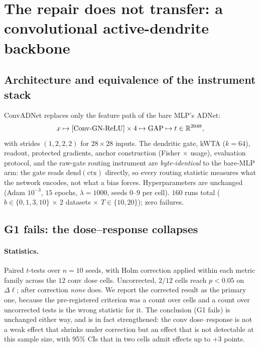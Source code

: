 \documentclass[10pt]{article}
\begin{document}





\section{The repair does not transfer: a convolutional active-dendrite backbone}
\label{sec:conv}

\subsection{Architecture and equivalence of the instrument stack}

ConvADNet replaces only the feature path of the bare MLP's ADNet:
\[
x \mapsto [\mathrm{Conv}{\text -}\mathrm{GN}{\text -}\mathrm{ReLU}]
\times 4 \mapsto \mathrm{GAP} \mapsto t \in \mathbb{R}^{2048},
\]
with strides $(1,2,2,2)$ for $28{\times}28$ inputs. The dendritic
gate, kWTA ($k{=}64$), readout, protected gradients, anchor
construction (Fisher $\times$ usage), evaluation protocol, and the
raw-gate routing instrument are \emph{byte-identical} to the bare-MLP arm: the gate
reads $\mathrm{dend}(\mathrm{ctx})$ directly, so every routing
statistic measures what the network encodes, not what a bias forces.
Hyperparameters are unchanged (Adam $10^{-3}$, $15$ epochs,
$\lambda{=}1000$, seeds $0$--$9$ per cell). $160$ runs total
($b \in \{0,1,3,10\}$ $\times$ $2$ datasets $\times$ $T \in
\{10,20\}$); zero failures.

\subsection{G1 fails: the dose--response collapses}
\label{sec:convstat}

\paragraph{Statistics.} Paired $t$-tests over $n=10$ seeds, with Holm correction applied within each metric family across the $12$ conv dose cells. Uncorrected, $2/12$ cells reach $p<0.05$ on $\Delta\ell$; after correction \emph{none} does. We report the corrected result as the primary one, because the pre-registered criterion was a count over cells and a count over uncorrected tests is the wrong statistic for it. The conclusion (G1 fails) is unchanged either way, and is in fact strengthened: the conv dose--response is not a weak effect that shrinks under correction but an effect that is not detectable at this sample size, with 95\% CIs that in two
cells admit effects up to $+3$ points.
\end{document}

